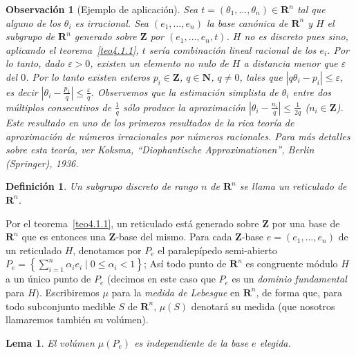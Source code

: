 \documentclass[oneside,bibtotoc,leqno,spanish]{amsbook}
\newcommand{\RR}{\mathbf{R}}
\newcommand{\ZZ}{\mathbf{Z}}
\newcommand{\NN}{\mathbf{N}}
\newcommand{\abs}[1]{\left\lvert#1\right\rvert}
\numberwithin{equation}{section}
\theoremstyle{defi}
\newtheorem{definition}{Definici\'on}
\theoremstyle{note}
\newtheorem{lemma}{Lema}
\theoremstyle{rem}
\newtheorem*{remark*}{Observaci\'on}
\numberwithin{theorem}{section}
\numberwithin{proposition}{section}
\numberwithin{definition}{section}
\numberwithin{lemma}{section}
\numberwithin{corollary}{section}
\numberwithin{example}{section}
\numberwithin{footnote}{section}%
\begin{document}
\begin{remark*}[Ejemplo de aplicaci\'on]
Sea $t = (\theta_{1},\dots,\theta_{n})\in\RR^{n}$ tal que alguno de
los $\theta_{i}$ es {\em irracional.} Sea $(e_{1},\dots,e_{n})$ la base can\'onica
de $\RR^{n}$ y $H$
el subgrupo de $\RR^{n}$ generado sobre $\ZZ$ por $(e_{1},\dots,e_{n},t)$. $H$ no es
discreto pues sino,
aplicando el teorema~\ref{teo4.1.1}, $t$ ser\'ia combinaci\'on lineal racional de
los $e_{i}$. Por lo tanto, dado
$\varepsilon > 0$, existen un elemento no nulo de $H$ a distancia menor que $\varepsilon$
del $0$. Por
lo tanto existen enteros $p_{i}\in\ZZ$, $q\in\NN$, $q\neq 0$, tales que
$\abs{q\theta_{i}-p_{i}}\leq\varepsilon$,
es decir $\abs{\theta_{i}-\frac{p_{1}}{q}}\leq\frac{\varepsilon}{q}$. Observemos que
la estimaci\'on simplista de $\theta_{i}$ entre dos m\'ultiplos consecutivos de
$\frac{1}{q}$ s\'olo
produce la aproximaci\'on $\abs{\theta_{i}-\frac{n_{i}}{q}}\leq\frac{1}{2q}$ ($n_{i}\in\ZZ$).
Este resultado en uno de los primeros resultados de la rica teor\'ia de aproximaci\'on de
n\'umeros
irracionales por n\'umeros racionales. Para m\'as detalles sobre esta teor\'ia, ver
Koksma, ``Diophantische Approximationen'', Berlin (Springer), 1936.
\end{remark*}

\begin{definition}
Un subgrupo discreto de rango $n$ de $\RR^{n}$ se llama un reticulado de $\RR^{n}$.
\end{definition}

Por el teorema~\ref{teo4.1.1}, un reticulado est\'a generado sobre $\ZZ$ por una base
de $\RR^{n}$ que es entonces
una $\ZZ$-base del mismo. Para cada $\ZZ$-base $e = (e_{1},\dots,e_{n})$ de un
reticulado $H$, denotamos
por $P_{e}$ el paralep\'ipedo semi-abierto
$P_{e} = \left\{\sum_{i=1}^{n}\alpha_{i}e_{i}\mid 0\leq \alpha_{i}<1\right\}$;
As\'i todo punto de $\RR^{n}$ es congruente m\'odulo $H$ a un \'unico punto de $P_{e}$
(decimos en este
caso que $P_{e}$ es un {\em dominio fundamental} para $H$). Escribiremos $\mu$ para
la {\em medida de
Lebesgue} en $\RR^{n}$, de forma que, para todo subconjunto medible $S$ de $\RR^{n}$,
$\mu(S)$ denotar\'a
su medida (que nosotros llamaremos tambi\'en su vol\'umen).

\begin{lemma}
El vol\'umen $\mu(P_{e})$ es independiente de la base $e$ elegida.
\end{lemma}
\end{document}
